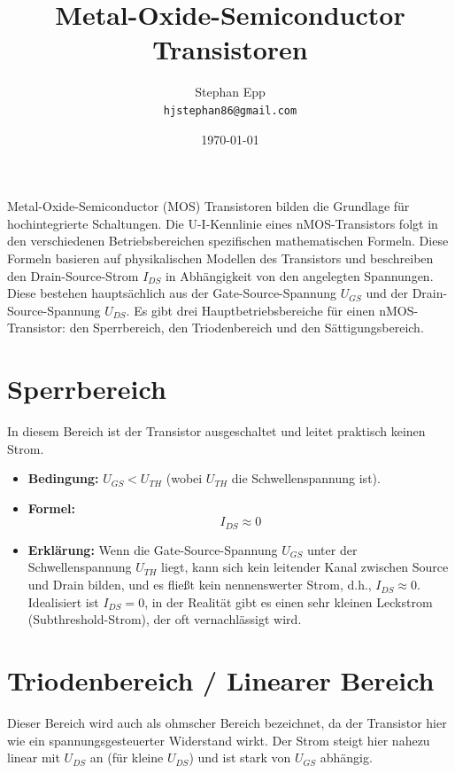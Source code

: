 \documentclass[oneside]{scrarticle}
\title{Metal-Oxide-Semiconductor Transistoren}
\author{Stephan Epp\\\texttt{hjstephan86@gmail.com}}
\date{\today}
\numberwithin{equation}{section}
\begin{document}
\maketitle
Metal-Oxide-Semiconductor (MOS) Transistoren bilden die Grundlage für hochintegrierte Schaltungen. Die U-I-Kennlinie eines nMOS-Transistors folgt in den verschiedenen Betriebsbereichen spezifischen mathematischen Formeln. Diese Formeln basieren auf physikalischen Modellen des Transistors und beschreiben den Drain-Source-Strom $I_{DS}$ in Abhängigkeit von den angelegten Spannungen. Diese bestehen hauptsächlich aus der Gate-Source-Spannung $U_{GS}$ und der Drain-Source-Spannung $U_{DS}$. Es gibt drei Hauptbetriebsbereiche für einen nMOS-Transistor: den Sperrbereich, den Triodenbereich und den Sättigungsbereich.

\section{Sperrbereich}
In diesem Bereich ist der Transistor ausgeschaltet und leitet praktisch keinen Strom.

\begin{itemize}
	\item \textbf{Bedingung:} $U_{GS} < U_{TH}$ (wobei $U_{TH}$ die Schwellenspannung ist).
	\item \textbf{Formel:}
	\begin{equation*}
		I_{DS} \approx 0
	\end{equation*}
	\item \textbf{Erklärung:} Wenn die Gate-Source-Spannung $U_{GS}$ unter der Schwellenspannung $U_{TH}$ liegt, kann sich kein leitender Kanal zwischen Source und Drain bilden, und es fließt kein nennenswerter Strom, d.h., $I_{DS} \approx 0$. Idealisiert ist $I_{DS} = 0$, in der Realität gibt es einen sehr kleinen Leckstrom (Subthreshold-Strom), der oft vernachlässigt wird.
\end{itemize}

\section{Triodenbereich / Linearer Bereich}
Dieser Bereich wird auch als ohmscher Bereich bezeichnet, da der Transistor hier wie ein spannungsgesteuerter Widerstand wirkt. Der Strom steigt hier nahezu linear mit $U_{DS}$ an (für kleine $U_{DS}$) und ist stark von $U_{GS}$ abhängig.
\end{document}
